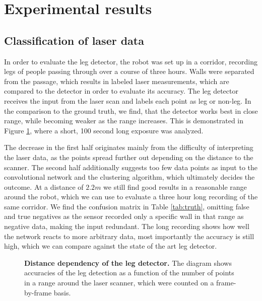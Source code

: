 \section{Experimental results}
\label{sec:Experiment}

\subsection{Classification of laser data}

In order to evaluate the leg detector, the robot was set up in a corridor, recording legs of people passing through over a course of three hours. Walls were separated from the passage, which results in labeled laser measurements, which are compared to the detector in order to evaluate its accuracy. The leg detector receives the input from the laser scan and labels each point as leg or non-leg.
In the comparison to the ground truth, we find, that the detector works best in close range, while becoming weaker as the range increases. This is demonstrated in Figure \ref{fig:radius_detection}, where a short, 100 second long exposure was analyzed.

The decrease in the first half originates mainly from the difficulty of interpreting the laser data, as the points spread further out depending on the distance to the scanner. The second half additionally suggests too few data points as input to the convolutional network and the clustering algorithm, which ultimately decides the outcome.
At a distance of $2.2 m$ we still find good results in a reasonable range around the robot, which we can use to evaluate a three hour long recording of the same corridor. We find the confusion matrix in Table \ref{tab:truth}, omitting false and true negatives as the sensor recorded only a specific wall in that range as negative data, making the input redundant. The long recording shows how well the network reacts to more arbitrary data, most importantly the accuracy is still high, which we can compare against the state of the art leg detector.

\begin{figure}
	\normalsize
	\begin{center}
		
	\end{center}
	\caption{\textbf{Distance dependency of the leg detector.} The diagram shows accuracies of the leg detection as a function of the number of points in a range around the laser scanner, which were counted on a frame-by-frame basis.}
	\label{fig:radius_detection}
\end{figure}

